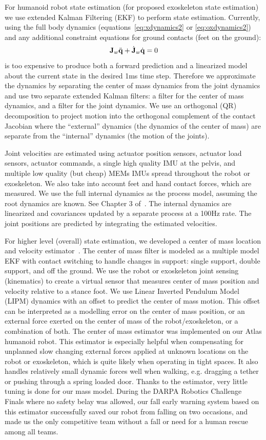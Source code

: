 \documentclass[letterpaper,12pt,fullpage]{article}
\begin{document}
For humanoid robot state estimation (for proposed exoskeleton state estimation)
we use extended Kalman Filtering (EKF) to perform state estimation.
Currently, using the full body dynamics 
(equations~\ref{eq:xdynamics2} or \ref{eq:oxdynamics2})
and any additional constraint equations for ground contacts (feet on the ground):
\begin{equation}
{\bf J}_w \ddot{{\bf q}} + \dot{{\bf J}}_w \dot{{\bf q}} = 0
\end{equation}
is too expensive to produce both a forward prediction and a linearized model
about the current state in the desired 1ms time step.
Therefore we approximate the dynamics by separating the center of mass dynamics
from the joint dynamics and use two separate extended Kalman filters:
a filter for the center of mass dynamics, and a filter for the joint dynamics.
We use an orthogonal (QR) decomposition to project motion into the orthogonal
complement of the contact Jacobian where the ``external'' dynamics (the dynamics
of the center of mass) are separate from the ``internal'' dynamics (the motion
of the joints).

Joint velocities are estimated using actuator position sensors, actuator load
sensors, actuator commands, a single high
quality IMU at the pelvis, and multiple low quality (but cheap) MEMs IMUs
spread throughout the robot or exoskeleton. We also take into account feet and hand
contact forces, which
are measured. We use the full internal dynamics as the process model,
assuming the root dynamics are known. See Chapter 3 of~\cite{Xinjelefu-thesis}.
The internal dynamics are linearized and covariances updated
by a separate process at a 100Hz rate.
The joint positions are predicted by integrating the estimated velocities.

For higher level (overall) state estimation,
we developed a center of mass location and velocity estimator~\cite{}.
The center of mass filter is modeled as a multiple model EKF with contact switching
to handle changes in support: single support, double support, and off the ground.
We use the robot or exoskeleton
joint sensing (kinematics) to create a virtual sensor that measures
center of mass position and velocity relative to a stance foot.
We use Linear
Inverted Pendulum Model (LIPM) dynamics with an offset to predict
the center of mass motion. This offset can be interpreted
as a modelling error on the center of mass position, or an
external force exerted on the center of mass of the robot/exoskeleton,
or a combination of both. The center of mass estimator was
implemented on our Atlas humanoid robot. 
This estimator is especially helpful when compensating
for unplanned slow changing external forces applied at
unknown locations on the robot or exoskeleton, which is quite likely when
operating in tight spaces. It also handles relatively small
dynamic forces well when walking, e.g. dragging a tether
or pushing through a spring loaded door. Thanks to
the estimator, very little tuning is done for our mass model.
During the DARPA
Robotics Challenge Finals
where no safety belay was
allowed, our fall early warning system based on this estimator
successfully saved our robot from
falling on two occasions, and made us the only competitive team
without a fall or need for a human rescue among all teams.
\end{document}
